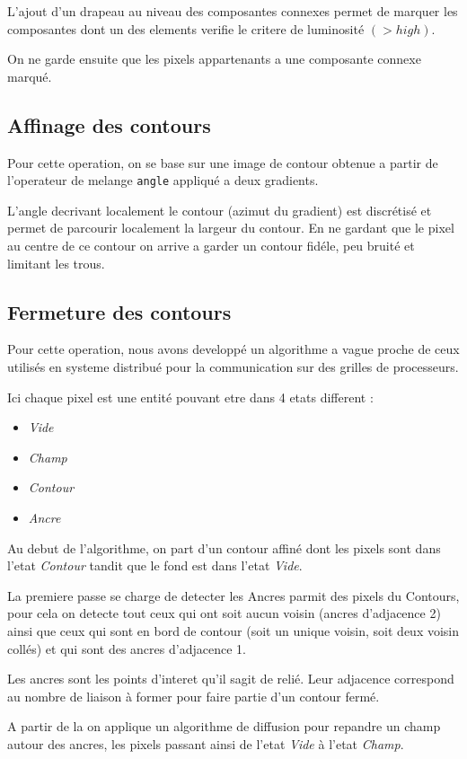 L'ajout d'un drapeau au niveau des composantes connexes permet de marquer les composantes dont un des elements verifie le critere de luminosité $(>high)$.

On ne garde ensuite que les pixels appartenants a une composante connexe marqué.

\subsection*{Affinage des contours}
Pour cette operation, on se base sur une image de contour obtenue a partir de l'operateur de melange \texttt{angle} appliqué a deux gradients.

L'angle decrivant localement le contour (azimut du gradient) est discrétisé et permet de parcourir localement la largeur du contour. En ne gardant que le pixel au centre de ce contour on arrive a garder un contour fidéle, peu bruité et limitant les trous.

\subsection*{Fermeture des contours}
Pour cette operation, nous avons developpé un algorithme a vague proche de ceux utilisés en systeme distribué pour la communication sur des grilles de processeurs.

Ici chaque pixel est une entité pouvant etre dans 4 etats different :
\begin{itemize}
	\item \emph{Vide}
	\item \emph{Champ}
	\item \emph{Contour}
	\item \emph{Ancre}
\end{itemize}

Au debut de l'algorithme, on part d'un contour affiné dont les pixels sont dans l'etat \emph{Contour} tandit que le fond est dans l'etat \emph{Vide}.

La premiere passe se charge de detecter les Ancres parmit des pixels du Contours, pour cela on detecte tout ceux qui ont soit aucun voisin (ancres d'adjacence 2) ainsi que ceux qui sont en bord de contour (soit un unique voisin, soit deux voisin collés) et qui sont des ancres d'adjacence 1.

Les ancres sont les points d'interet qu'il sagit de relié. Leur adjacence correspond au nombre de liaison à former pour faire partie d'un contour fermé.

A partir de la on applique un algorithme de diffusion pour repandre un champ autour des ancres, les pixels passant ainsi de l'etat \emph{Vide} à l'etat \emph{Champ}.

